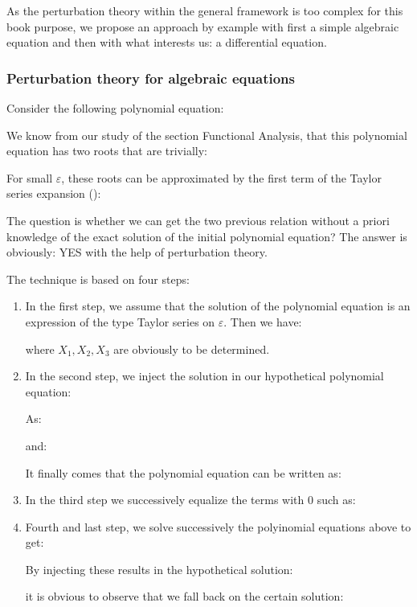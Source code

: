 	As the perturbation theory within the general framework is too complex for this book purpose, we propose an approach by example with first a simple algebraic equation and then with what interests us: a differential equation.
	
	\subsubsection{Perturbation theory for algebraic equations}
	Consider the following polynomial equation:
	
	We know from our study of the section Functional Analysis, that this polynomial equation has two roots that are trivially:
	
	For small $\varepsilon$, these roots can be approximated by the first term of the Taylor series expansion ():
	
	The question is whether we can get the two previous relation without a priori knowledge of the exact solution of the initial polynomial equation? The answer is obviously: YES with the help of perturbation theory.
	
	The technique is based on four steps:
	\begin{enumerate}
		\item In the first step, we assume that the solution of the polynomial equation is an expression of the type Taylor series on $\varepsilon$. Then we have:
		
		where $X_1,X_2,X_3$ are obviously to be determined.
		\item In the second step, we inject the solution in our hypothetical polynomial equation:
		
		As:
		
		and:
		
		It finally comes that the polynomial equation can be written as:
		
		
		\item In the third step we successively equalize the terms with 0 such as:
		
		\item Fourth and last step, we solve successively the polyinomial equations above to get:
		
		By injecting these results in the hypothetical solution:
		
		it is obvious to observe that we fall back on the certain solution:
		
	\end{enumerate}
	
